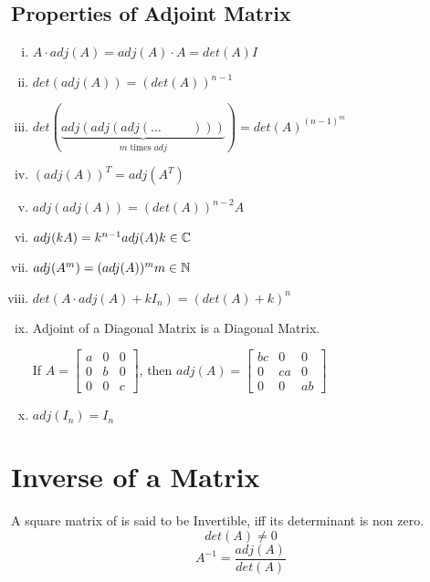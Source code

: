 \documentclass{article}
\begin{document}
\subsection{Properties of Adjoint Matrix}
\begin{enumerate}[i.]
    \item $A \cdot adj(A)= adj(A) \cdot A= det(A) I $
    \item $det(adj(A))=\left(det(A)\right)^{n-1}$
    \item $det(\underbrace{adj(adj(adj( \ldots \hspace{1cm})))}_{m \text{ times } adj})=det(A)^{\left(n-1\right)^{m}}$
    \item $\left(adj(A)\right)^T=adj(A^T)$
    \item $adj(adj(A))=(det(A))^{n-2}A$
    \item $adj(kA)=k^{n-1}adj(A) \hfill k \in \mathbb{C}$
    \item $adj(A^m)=(adj(A))^m \hfill m \in \mathbb{N}$
    \item $det(A \cdot adj(A)+kI_{n})=\left(det(A)+k\right)^n$
    \item Adjoint of a Diagonal Matrix is a Diagonal Matrix.

          If $A= {\begin{bmatrix}
                  a & 0 & 0 \\
                  0 & b & 0 \\
                  0 & 0 & c
              \end{bmatrix}} $, then $adj(A)=\begin{bmatrix}
                  bc & 0  & 0  \\
                  0  & ca & 0  \\
                  0  & 0  & ab
              \end{bmatrix}$
    \item $adj(I_{n})=I_{n}$
\end{enumerate}

\section{Inverse of a Matrix}
A square matrix of is said to be Invertible, iff its determinant is non zero.
$$det(A)\not=0$$
$$A^{-1}=\dfrac{adj(A)}{det(A)}$$
\end{document}
